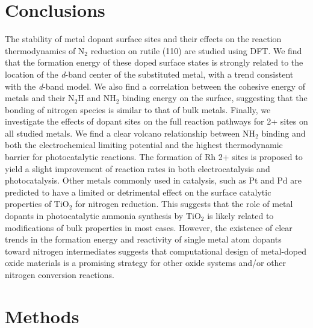 \section{Conclusions}
The stability of metal dopant surface sites and their effects on the reaction thermodynamics of N$_2$ reduction on rutile (110) are studied using DFT. We find that the formation energy of these doped surface states is strongly related to the location of the \textit{d}-band center of the substituted metal, with a trend consistent with the \textit{d}-band model. We also find a correlation between the cohesive energy of metals and their N$_2$H and NH$_2$ binding energy on the surface, suggesting that the bonding of nitrogen species is similar to that of bulk metals. Finally, we investigate the effects of dopant sites on the full reaction pathways for 2+ sites on all studied metals. We find a clear volcano relationship between NH$_2$ binding and both the electrochemical limiting potential and the highest thermodynamic barrier for photocatalytic reactions. The formation of Rh 2+ sites is proposed to yield a slight improvement of reaction rates in both electrocatalysis and photocatalysis. Other metals commonly used in catalysis, such as Pt and Pd are predicted to have a limited or detrimental effect on the surface catalytic properties of TiO$_2$ for nitrogen reduction. This suggests that the role of metal dopants in photocatalytic ammonia synthesis by TiO$_2$ is likely related to modifications of bulk properties in most cases. However, the existence of clear trends in the formation energy and reactivity of single metal atom dopants toward nitrogen intermediates suggests that computational design of metal-doped oxide materials is a promising strategy for other oxide systems and/or other nitrogen conversion reactions.




\section{Methods}
\label{sec:methods}

